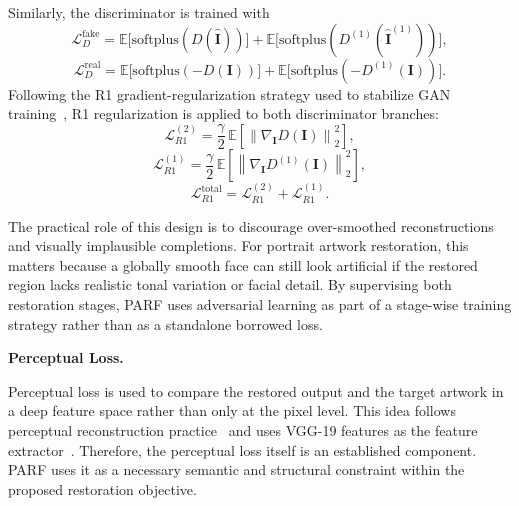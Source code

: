 \documentclass[12pt, twoside]{report}
\begin{document}
Similarly, the discriminator is trained with
\begin{equation}
\mathcal{L}_{D}^{\mathrm{fake}} =
\mathbb{E}\big[\mathrm{softplus}(D(\hat{\mathbf{I}}))\big] +
\mathbb{E}\big[\mathrm{softplus}(D^{(1)}(\hat{\mathbf{I}}^{(1)}))\big],
\end{equation}
\begin{equation}
\mathcal{L}_{D}^{\mathrm{real}} =
\mathbb{E}\big[\mathrm{softplus}(-D(\mathbf{I}))\big] +
\mathbb{E}\big[\mathrm{softplus}(-D^{(1)}(\mathbf{I}))\big].
\end{equation}
Following the R1 gradient-regularization strategy used to stabilize GAN training~\cite{mescheder2018training}, R1 regularization is applied to both discriminator branches:
\begin{equation}
\mathcal{L}_{R1}^{(2)} =
\frac{\gamma}{2}\, \mathbb{E}\left[\left\|\nabla_{\mathbf{I}} D(\mathbf{I})\right\|_2^2\right],
\end{equation}
\begin{equation}
\mathcal{L}_{R1}^{(1)} =
\frac{\gamma}{2}\, \mathbb{E}\left[\left\|\nabla_{\mathbf{I}} D^{(1)}(\mathbf{I})\right\|_2^2\right],
\end{equation}
\begin{equation}
\mathcal{L}_{R1}^{\mathrm{total}} = \mathcal{L}_{R1}^{(2)} + \mathcal{L}_{R1}^{(1)}.
\end{equation}

The practical role of this design is to discourage over-smoothed reconstructions and visually implausible completions. For portrait artwork restoration, this matters because a globally smooth face can still look artificial if the restored region lacks realistic tonal variation or facial detail. By supervising both restoration stages, PARF uses adversarial learning as part of a stage-wise training strategy rather than as a standalone borrowed loss.

\noindent\textbf{Perceptual Loss.}\par

Perceptual loss is used to compare the restored output and the target artwork in a deep feature space rather than only at the pixel level. This idea follows perceptual reconstruction practice~\cite{johnson2016perceptual} and uses VGG-19 features as the feature extractor~\cite{simonyan2015vgg}. Therefore, the perceptual loss itself is an established component. PARF uses it as a necessary semantic and structural constraint within the proposed restoration objective.
\end{document}
